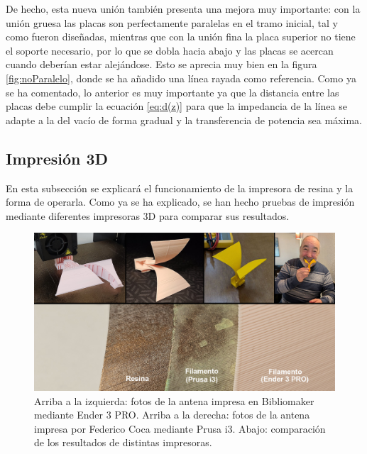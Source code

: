 \documentclass[11pt,a4paper,twoside,pdf]{article}
\numberwithin{equation}{section}
\begin{document}
De hecho, esta nueva unión también presenta una mejora muy importante: con la unión gruesa las placas son perfectamente paralelas en el tramo inicial, tal y como fueron diseñadas, mientras que con la unión fina la placa superior no tiene el soporte necesario, por lo que se dobla hacia abajo y las placas se acercan cuando deberían estar alejándose. Esto se aprecia muy bien en la figura \ref{fig:noParalelo}, donde se ha añadido una línea rayada como referencia. Como ya se ha comentado, lo anterior es muy importante ya que la distancia entre las placas debe cumplir la ecuación \ref{eq:d(z)} para que la impedancia de la línea se adapte a la del vacío de forma gradual y la transferencia de potencia sea máxima.


\subsection{Impresión 3D}


En esta subsección se explicará el funcionamiento de la impresora de resina y la forma de operarla. Como ya se ha explicado, se han hecho pruebas de impresión mediante diferentes impresoras 3D para comparar sus resultados.
\begin{figure}[!h]
    \centering
    \includegraphics[width=\linewidth]{img/fotos/filamento.jpg}
    \vspace{-0.5cm}
    \caption{Arriba a la izquierda: fotos de la antena impresa en Bibliomaker mediante Ender 3 PRO. Arriba a la derecha: fotos de la antena impresa por Federico Coca mediante Prusa i3. Abajo: comparación de los resultados de distintas impresoras.}
    \label{fig:filamento}
\end{figure}
\end{document}
